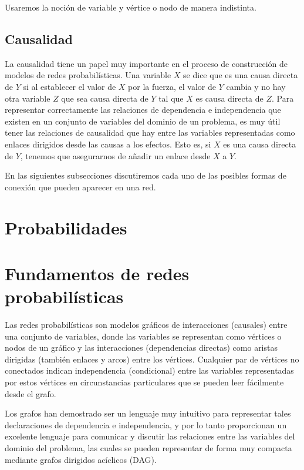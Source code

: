 Usaremos la noción de variable y vértice o nodo de manera indistinta.  

\subsection{Causalidad}
La causalidad tiene un papel muy importante en el proceso de construcción de modelos de redes 
probabilísticas. Una variable $X$ se dice que es una causa directa de $Y$ si al establecer el valor 
de $X$ por la fuerza, el valor de $Y$ cambia y no hay otra variable $Z$ que sea causa directa de 
$Y$ tal que $X$ es causa directa de $Z$. Para representar correctamente las relaciones de dependencia 
e independencia que existen en un conjunto de variables 
del dominio de un problema, es muy útil tener las relaciones de causalidad que hay entre las variables 
representadas como enlaces dirigidos desde las causas 
a los efectos. Esto es, si $X$ es una causa directa de $Y$, tenemos que asegurarnos de añadir un enlace 
desde $X$ a $Y$. 

En las siguientes subsecciones discutiremos cada uno de las posibles formas de conexión que pueden aparecer en una red.

\section{Probabilidades} 
\section{Fundamentos de redes probabilísticas}
Las redes probabilísticas son modelos gráficos de interacciones (causales) entre una
conjunto de variables, donde las variables se representan como vértices o nodos de un 
gráfico y las interacciones (dependencias directas) como aristas dirigidas (también
enlaces y arcos) entre los vértices. Cualquier par de vértices no conectados indican 
independencia (condicional) entre las variables representadas
por estos vértices en circunstancias particulares que se pueden leer fácilmente desde el
grafo. 

Los grafos han demostrado ser un lenguaje muy intuitivo para representar
tales declaraciones de dependencia e independencia, y por lo tanto proporcionan un excelente
lenguaje para comunicar y discutir las relaciones entre las 
variables del dominio del problema, las cuales se pueden representar de forma muy compacta 
mediante grafos dirigidos acíclicos (DAG).

